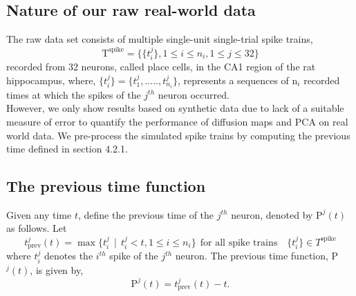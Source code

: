 \subsection{Nature of our raw real-world data}
The raw data set consists  of multiple single-unit single-trial spike trains,\\
\[ 
\text{T}^{\text{spike}} = \displaystyle \{ \{ t_{i}^{j} \} , 1 \leq i \leq n_{i}, 1 \leq j \leq 32 \}  
\]
recorded from 32 neurons, called  place cells, in the CA1 region of the rat hippocampus, where,
$\displaystyle  \{t_{i}^{j}\} =  \{t_{1}^{j}, ....., t_{n_{i}}^{j} \} $, represents  a sequences of n$_{i}$ recorded times at which the spikes of the $j^{th}$ neuron occurred. \\
However, we only show results based on synthetic data due to lack of a suitable measure of error to quantify 
the performance of  diffusion maps and PCA on real world data.  We pre-process the simulated spike trains by computing  the previous time  defined in section 4.2.1.
 


\subsection{The previous time function}

Given any time $t$, define the previous time of the $j^{th}$ neuron, denoted by $\text{P}^{j}(t)$ as follows. Let 
\[
t^{j}_{\text{prev}}(t) = \displaystyle \max  \{  t^{j}_{i} \ \ | \ \ t^{j}_{i} < t, 1 \leq i \leq n_{i} \} \ \ \text{for all spike trains} \quad  \{t^{j}_{i}\} \in T^{\text{spike}} 
\]
where $t^j_i$ denotes the $i^{th}$ spike of the $j^{th}$ neuron.  The previous time function, P$^{j}(t)$, is given by, 
\begin{equation}\label{prevtimefun}
\text{P}^{j}(t) = t^{j}_{\text{prev}}(t) - t.
\end{equation}


